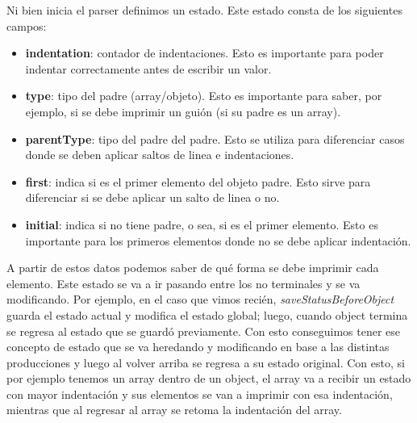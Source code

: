 Ni bien inicia el parser definimos un estado. Este estado consta de los siguientes campos:
\begin{itemize}
    \item \textbf{indentation}: contador de indentaciones. Esto es importante para poder indentar correctamente antes de escribir un valor.
    \item \textbf{type}: tipo del padre (array/objeto). Esto es importante para saber, por ejemplo, si se debe imprimir un guión (si su padre es un array).
    \item \textbf{parentType}: tipo del padre del padre. Esto se utiliza para diferenciar casos donde se deben aplicar saltos de linea e indentaciones.
    \item \textbf{first}: indica si es el primer elemento del objeto padre. Esto sirve para diferenciar si se debe aplicar un salto de linea o no.
    \item \textbf{initial}: indica si no tiene padre, o sea, si es el primer elemento. Esto es importante para los primeros elementos donde no se debe aplicar indentación.
\end{itemize}

A partir de estos datos podemos saber de qué forma se debe imprimir cada elemento. Este estado se va a ir pasando entre los no terminales y se va modificando. Por ejemplo, en el caso que vimos recién, \textit{saveStatusBeforeObject} guarda el estado actual y modifica el estado global; luego, cuando object termina se regresa al estado que se guardó previamente. Con esto conseguimos tener ese concepto de estado que se va heredando y modificando en base a las distintas producciones y luego al volver arriba se regresa a su estado original. Con esto, si por ejemplo tenemos un array dentro de un object, el array va a recibir un estado con mayor indentación y sus elementos se van a imprimir con esa indentación, mientras que al regresar al array se retoma la indentación del array.
